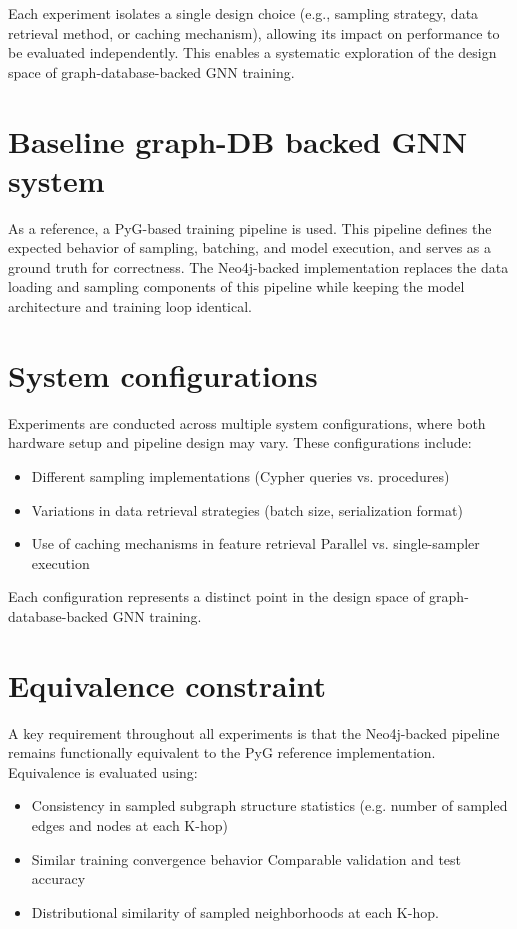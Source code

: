 \documentclass[ oneside,openright,titlepage,numbers=noenddot,headinclude,%
                footinclude=true,cleardoublepage=empty,abstractoff, %
                BCOR=0mm,paper=a4,fontsize=11pt,%
                ngerman,american,%
                ]{scrreprt}
\begin{document}
Each experiment isolates a single design choice (e.g., sampling strategy, data retrieval method, or caching mechanism), allowing its impact on performance to be evaluated independently. This enables a systematic exploration of the design space of graph-database-backed GNN training.


\section{Baseline graph-DB backed GNN system}
As a reference, a PyG-based training pipeline is used. This pipeline defines the expected behavior of sampling, batching, and model execution, and serves as a ground truth for correctness.
The Neo4j-backed implementation replaces the data loading and sampling components of this pipeline while keeping the model architecture and training loop identical.


\section{System configurations}
Experiments are conducted across multiple system configurations, where both hardware setup and pipeline design may vary. These configurations include:

\begin{itemize}
    \item Different sampling implementations (Cypher queries vs. procedures)
    \item Variations in data retrieval strategies (batch size, serialization format)
    \item Use of caching mechanisms in feature retrieval
Parallel vs. single-sampler execution
\end{itemize}

Each configuration represents a distinct point in the design space of graph-database-backed GNN training.

\section{Equivalence constraint}

A key requirement throughout all experiments is that the Neo4j-backed pipeline remains functionally equivalent to the PyG reference implementation.
Equivalence is evaluated using:
\begin{itemize}
    \item Consistency in sampled subgraph structure statistics (e.g. number of sampled edges and nodes at each K-hop) 
    \item Similar training convergence behavior
Comparable validation and test accuracy
\item Distributional similarity of sampled neighborhoods at each K-hop.

\end{itemize}
\end{document}
